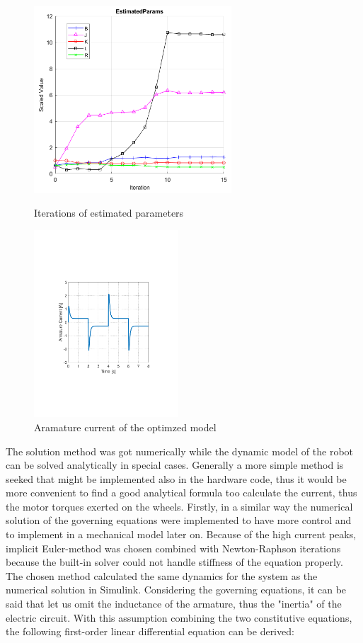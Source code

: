 \documentclass[12pt,english]{article}
\begin{document}
 \begin{figure}[htb!]
 	\centering
 	\includegraphics[height=7cm]{figures/simulink_par_est_2.png}
 	\caption{Iterations of estimated parameters}
 	\endminipage\hfill
 	\centering
 	\includegraphics[height=7cm]{figures/simulink_armature_current}
 	\caption{Aramature current of the optimzed model}
 	\label{simulink_armature_current}
 	\endminipage\hfill
 \end{figure}
The solution method was got numerically while the dynamic model of the robot can be solved analytically in special cases. Generally a more simple method is seeked that might be implemented also in the hardware code, thus it would be more convenient to find a good analytical formula too calculate the current, thus the motor torques exerted on the wheels. Firstly, in a similar way the numerical solution of the governing equations were implemented to have more control and to implement in a mechanical model later on. Because of the high current peaks, implicit Euler-method was chosen combined with Newton-Raphson iterations because the built-in solver could not handle stiffness of the equation properly. The chosen method calculated the same dynamics for the system as the numerical solution in Simulink. Considering the governing equations, it can be said that let us omit the inductance of the armature, thus the "inertia" of the electric circuit. With this assumption combining the two constitutive equations, the following first-order linear differential equation can be derived:
\end{document}
